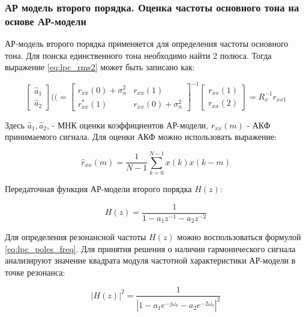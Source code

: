 \subsubsection{АР модель второго порядка. Оценка частоты основного тона на основе АР-модели}

АР-модель второго порядка применяется для определения частоты основного тона. Для поиска единственного
тона необходимо найти 2 полюса. Тогда выражение \ref{eq:lpc_rms2} может быть записано как:
\begin{center}
\begin{equation}
	\label{eq:lpc_a_estimation}
	\left[ \begin{array}{c}
		\hat{a}_1 \\
		\hat{a}_2
	\end{array} \right]
	((=
		\left[ \begin{array}{cc}
			r_{xx}(0)  + \sigma_n^2 & r_{xx}(1)\\
			r_{xx}^*(1) & r_{xx}(0) + \sigma_n^2 
		\end{array} \right]^{-1}
		\left[ \begin{array}{c}
			r_{xx}(1) \\
			r_{xx}(2)
		\end{array} \right]
	= R_x^{-1}r_{xx1}
\end{equation}
\end{center}

Здесь ${\hat{a}_1, \hat{a}_2}$, - МНК оценки коэффициентов АР-модели, ${r_{xx}(m)}$ - АКФ принимаемого сигнала.
Для оценки АКФ  можно использовать выражение:
\begin{center}
\begin{equation}
	\label{eq:lpc_rxx_estimation}
	\hat{r}_{xx}(m) = \frac{1}{N-1} \sum \limits_{k=0}^{N-1} x(k)x(k-m)
\end{equation}
\end{center}

Передаточная функция АР-модели второго порядка ${H(z)}$:
\begin{center}
\begin{equation}
	\label{eq:lpc_spectral_func}
	H(z) = \frac{1}{1 - a_1 z^{-1} - a_2 z^{-2}}
\end{equation}
\end{center}

Для определения резонансной частоты ${H(z)}$ можно воспользоваться формулой \ref{eq:lpc_poles_freq}.
Для принятия решения о наличии гармонического сигнала анализируют значение квадрата модуля частотной
характеристики АР-модели в точке резонанса:
\begin{center}
\begin{equation}
	\label{eq:lpc_power_cos}
	\left| H(z) \right|^2 = \frac{1}{\left| 1 - a_1 e^{-j \omega_0} - a_2 e^{-2 \omega_0} \right|^2}
\end{equation}
\end{center}

